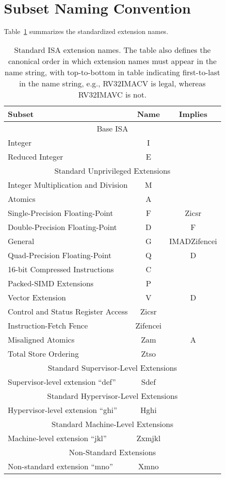 \section{Subset Naming Convention}
Table~\ref{isanametable} summarizes the standardized extension names.
~\\
\begin{table}[h]
\center
\begin{tabular}{|l|c|c|}
\hline
Subset & Name & Implies \\
\hline
\hline
\multicolumn{3}{|c|}{Base ISA}\\
\hline
Integer & I & \\
Reduced Integer & E & \\
\hline
\hline
\multicolumn{3}{|c|}{Standard Unprivileged Extensions}\\
\hline
Integer Multiplication and Division & M & \\
Atomics & A & \\
Single-Precision Floating-Point & F & Zicsr \\
Double-Precision Floating-Point & D & F \\
\hline
General & G & IMADZifencei \\
\hline
Quad-Precision Floating-Point & Q & D\\
16-bit Compressed Instructions & C & \\
Packed-SIMD Extensions & P & \\
Vector Extension & V & D \\
Control and Status Register Access & Zicsr & \\
Instruction-Fetch Fence & Zifencei & \\
Misaligned Atomics & Zam & A \\
Total Store Ordering & Ztso & \\
\hline
\hline
\multicolumn{3}{|c|}{Standard Supervisor-Level Extensions}\\
\hline
Supervisor-level extension ``def'' & Sdef & \\
\hline
\hline
\multicolumn{3}{|c|}{Standard Hypervisor-Level Extensions}\\
\hline
Hypervisor-level extension ``ghi'' & Hghi & \\
\hline
\hline
\multicolumn{3}{|c|}{Standard Machine-Level Extensions}\\
\hline
Machine-level extension ``jkl'' & Zxmjkl & \\
\hline
\hline
\multicolumn{3}{|c|}{Non-Standard Extensions}\\
\hline
Non-standard extension ``mno'' & Xmno & \\
\hline
\end{tabular}
\caption{Standard ISA extension names.  The table also defines the
  canonical order in which extension names must appear in the name
  string, with top-to-bottom in table indicating first-to-last in the
  name string, e.g., RV32IMACV is legal, whereas RV32IMAVC is not.}
\label{isanametable}
\end{table}


